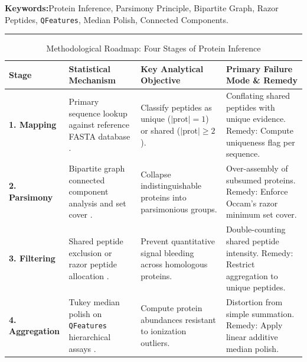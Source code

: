 \documentclass[11pt,twoside,openright]{book}
\begin{document}
\noindent
\textbf{Keywords:}\enspace Protein Inference, Parsimony Principle, Bipartite Graph, Razor Peptides, \texttt{QFeatures}, Median Polish, Connected Components.

\vspace{0.8em}
\noindent\rule{\textwidth}{0.4pt}


\begin{table}[ht]
\centering
\caption{Methodological Roadmap: Four Stages of Protein Inference}
\label{tab:inference_roadmap}
\small
\begin{tabularx}{\textwidth}{l p{3.8cm} p{4.2cm} X}
\toprule
\textbf{Stage} & \textbf{Statistical Mechanism} & \textbf{Key Analytical Objective} & \textbf{Primary Failure Mode \& Remedy} \\
\midrule
\textbf{1. Mapping} & Primary sequence lookup against reference FASTA database \cite{nesvizhskii2005interpretation, gatto2023psmatch}. & Classify peptides as unique ($|\text{prot}| = 1$) or shared ($|\text{prot}| \ge 2$). & Conflating shared peptides with unique evidence. Remedy: Compute uniqueness flag per sequence. \\
\addlinespace
\textbf{2. Parsimony} & Bipartite graph connected component analysis and set cover \cite{zhang2007idpicker, chvatal1979greedy, csardi2006igraph}. & Collapse indistinguishable proteins into parsimonious groups. & Over-assembly of subsumed proteins. Remedy: Enforce Occam's razor minimum set cover. \\
\addlinespace
\textbf{3. Filtering} & Shared peptide exclusion or razor peptide allocation \cite{cox2008maxquant, cox2014maxquant, savitski2015measuring}. & Prevent quantitative signal bleeding across homologous proteins. & Double-counting shared peptide intensity. Remedy: Restrict aggregation to unique peptides. \\
\addlinespace
\textbf{4. Aggregation} & Tukey median polish on \texttt{QFeatures} hierarchical assays \cite{tukey1977exploratory, gatto2023qfeatures, vanderaa2021reproducible, goeminne2016msqrob}. & Compute protein abundances resistant to ionization outliers. & Distortion from simple summation. Remedy: Apply linear additive median polish. \\
\bottomrule
\end{tabularx}
\end{table}
\end{document}
